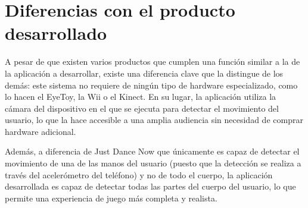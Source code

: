\section{Diferencias con el producto desarrollado}
\label{sec:diferencias-producto}
A pesar de que existen varios productos que cumplen una función similar a la de
la aplicación a desarrollar, existe una diferencia clave que la distingue de los
demás: este sistema no requiere de ningún tipo de hardware especializado, como
lo hacen el EyeToy, la Wii o el Kinect. En su lugar, la aplicación utiliza la
cámara del dispositivo en el que se ejecuta para detectar el movimiento del
usuario, lo que la hace accesible a una amplia audiencia sin necesidad de
comprar hardware adicional.

Además, a diferencia de Just Dance Now que únicamente es capaz de detectar el
movimiento de una de las manos del usuario (puesto que la detección se realiza a
través del acelerómetro del teléfono) y no de todo el cuerpo, la aplicación
desarrollada es capaz de detectar todas las partes del cuerpo del usuario, lo
que permite una experiencia de juego más completa y realista.
